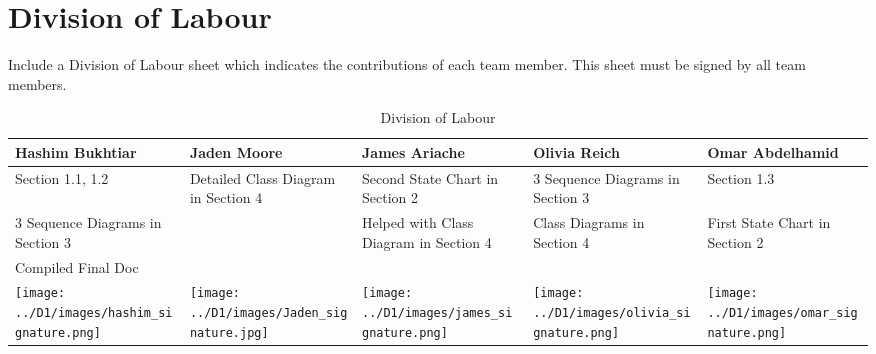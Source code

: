 \documentclass[]{article}
\begin{document}
\appendix
\section{Division of Labour}
\label{sec:division_of_labour}
Include a Division of Labour sheet which indicates the contributions of each team member. This sheet must be signed by all team members.

\begin{table}[h!]
\centering
\begin{tabular}{|p{3.5cm}|p{3.5cm}|p{3cm}|p{3.5cm}|p{3cm}|}
\hline
Hashim Bukhtiar & Jaden Moore & James Ariache & Olivia Reich & Omar Abdelhamid \\ \hline
Section 1.1, 1.2 & Detailed Class Diagram in Section 4 & Second State Chart in Section 2 & 3 Sequence Diagrams in Section 3 & Section 1.3 \\ 
3 Sequence Diagrams in Section 3 &  & Helped with Class Diagram in Section 4 & Class Diagrams in Section 4 & First State Chart in Section 2 \\
Compiled Final Doc &  &  &  & \\

\texttt{[image: ../D1/images/hashim\_signature.png]} & \texttt{[image: ../D1/images/Jaden\_signature.jpg]} &
\texttt{[image: ../D1/images/james\_signature.png]}& \texttt{[image: ../D1/images/olivia\_signature.png]} & \texttt{[image: ../D1/images/omar\_signature.png]}  \\
\hline
\end{tabular}
\caption{Division of Labour} 
\label{tab:division_of_labour}
\end{table}


\newpage
\end{document}
